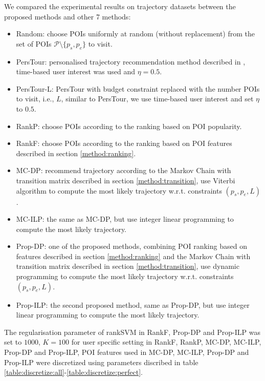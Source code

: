 We compared the experimental results on trajectory datasets between the proposed methods and other 7 methods:
\begin{itemize}
\item Random: choose POIs uniformly at random (without replacement) from the set of POIs $\mathcal{P} \setminus \{p_s, p_e \}$ to visit.
\item PersTour\cite{ijcai15}: personalised trajectory recommendation method described in \cite{ijcai15}, 
      time-based user interest was used and $\eta = 0.5$.
\item PersTour-L: PersTour\cite{ijcai15} with budget constraint replaced with the number POIs to visit, i.e., $L$,
      similar to PersTour, we use time-based user interest and set $\eta$ to $0.5$.
\item RankP: choose POIs according to the ranking based on POI popularity.
\item RankF: choose POIs according to the ranking based on POI features described in section \ref{method:ranking}.
\item MC-DP: recommend trajectory according to the Markov Chain with transition matrix described in section \ref{method:transition},
      use Viterbi algorithm to compute the most likely trajectory w.r.t. constraints $(p_s, p_e, L)$.
\item MC-ILP: the same as MC-DP, but use integer linear programming to compute the most likely trajectory.
\item Prop-DP: one of the proposed methods, combining POI ranking based on features 
      described in section \ref{method:ranking} and the Markov Chain with transition matrix described in section \ref{method:transition},
      use dynamic programming to compute the most likely trajectory w.r.t. constraints $(p_s, p_e, L)$.
\item Prop-ILP: the second proposed method, same as Prop-DP,
      but use integer linear programming to compute the most likely trajectory.
\end{itemize}

The regularisation parameter of rankSVM in RankF, Prop-DP and Prop-ILP was set to $1000$,
$K=100$ for user specific setting in RankF, RankP, MC-DP, MC-ILP, Prop-DP and Prop-ILP,
POI features used in MC-DP, MC-ILP, Prop-DP and Prop-ILP were discretized using parameters discribed in 
table \ref{table:discretize:all}-\ref{table:discretize:perfect}.


